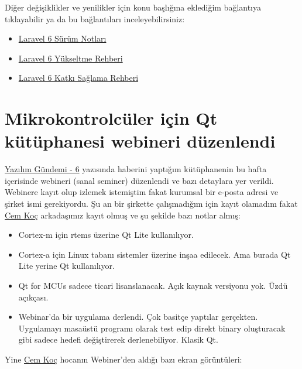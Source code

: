 \documentclass[11pt]{article}
\begin{document}
Diğer değişiklikler ve yenilikler için konu başlığına eklediğim bağlantıya
tıklayabilir ya da bu bağlantıları inceleyebilirsiniz:
\begin{itemize}
\item \href{https://laravel.com/docs/6.0/releases}{Laravel 6 Sürüm Notları}
\item \href{https://laravel.com/docs/6.0/upgrade}{Laravel 6 Yükseltme Rehberi}
\item \href{https://laravel-news.com/laravel-6}{Laravel 6 Katkı Sağlama Rehberi}
\end{itemize}
\section{Mikrokontrolcüler için Qt kütüphanesi webineri düzenlendi}
\label{sec:orgbfe3b99}
\href{../06/yazilim-gundemi-06.pdf}{Yazılım Gündemi - 6} yazısında haberini yaptığım kütüphanenin bu hafta
içerisinde webineri (sanal seminer) düzenlendi ve bazı detaylara yer verildi.
Webinere kayıt olup izlemek istemiştim fakat kurumsal bir e-posta adresi ve
şirket ismi gerekiyordu. Şu an bir şirkette çalışmadığım için kayıt olamadım
fakat \href{https://teknoseyir.com/u/cemkoc}{Cem Koç} arkadaşımız kayıt olmuş ve şu şekilde bazı notlar almış:

\begin{itemize}
\item Cortex-m için rtems üzerine Qt Lite kullanılıyor.
\item Cortex-a için Linux tabanı sistemler üzerine inşaa edilecek. Ama burada Qt
Lite yerine Qt kullanılıyor.
\item Qt for MCUs sadece ticari lisanslanacak. Açık kaynak versiyonu yok. Üzdü
açıkçası.
\item Webinar'da bir uygulama derlendi. Çok basitçe yaptılar gerçekten.
Uygulamayı masaüstü programı olarak test edip direkt binary oluşturacak
gibi sadece hedefi değiştirerek derlenebiliyor. Klasik Qt.
\end{itemize}

Yine \href{https://teknoseyir.com/u/cemkoc}{Cem Koç} hocanın Webiner'den aldığı bazı ekran görüntüleri:
\end{document}
